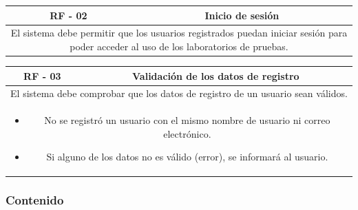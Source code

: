                 \begin{table}[!htbp]
                    \centering

                    \begin{tabular}{|c|c|}
                        \hline
                        \textbf{RF - 02} & \textbf{Inicio de sesión} \\
                        \hline
                        \multicolumn{2}{|p{15cm}|}{
                            El sistema debe permitir que los usuarios registrados puedan iniciar sesión para poder acceder al uso de los laboratorios de pruebas.
                        } \\
                        \hline
                    \end{tabular}

                    \label{tab:RF02}
                \end{table}
                
                \begin{table}[!htbp]
                    \centering

                    \begin{tabular}{|c|c|}
                        \hline
                        \textbf{RF - 03} & \textbf{Validación de los datos de registro} \\
                        \hline
                        \multicolumn{2}{|p{15cm}|}{
                            El sistema debe comprobar que los datos de registro de un usuario sean válidos.
                        } \\
                        \hline
                        \multicolumn{2}{|p{15cm}|}{
                            \begin{itemize}
                                \item No se registró un usuario con el mismo nombre de usuario ni correo electrónico.
                                \item Si alguno de los datos no es válido (error), se informará al usuario.
                            \end{itemize}
                            } \\
                        \hline
                    \end{tabular}

                    \label{tab:RF03}
                \end{table}
            
            \subsubsection{Contenido}
            
